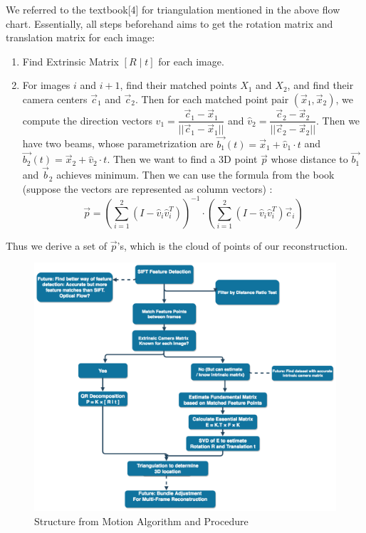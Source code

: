 \documentclass[10pt]{article}
\begin{document}
We referred to the textbook[4] for triangulation mentioned in the above flow chart. Essentially, all steps beforehand aims to get the rotation matrix and translation matrix for each image:
\begin{enumerate}
	\item Find Extrinsic Matrix $[R \mid t]$ for each image.
	\item For images $i$ and $i+1$, find their matched points $X_1$ and $X_2$, and find their camera centers $\vec{c}_1$ and $\vec{c}_2$. Then for each matched point pair $(\vec{x}_1, \vec{x}_2)$, we compute the direction vectors $\hat{v}_1 = \dfrac{\vec{c}_1 - \vec{x}_1}{||\vec{c}_1 - \vec{x}_1||}$ and $\hat{v}_2 = \dfrac{\vec{c}_2 - \vec{x}_2}{||\vec{c}_2 - \vec{x}_2||}$. Then we have two beams, whose parametrization are $\vec{b_1}(t) = \vec{x}_1 + \hat{v}_1 \cdot t$  and $\vec{b_2} (t) = \vec{x}_2 + \hat{v}_2 \cdot t$. Then we want to find a 3D point $\vec{p}$ whose distance to $\vec{b_1}$ and $\vec{b}_2$ achieves minimum. Then we can use the formula from the book (suppose the vectors are represented as column vectors) : $$\displaystyle \vec{p} = \left(\sum_{i=1}^2 (I - \hat{v}_i \hat{v}_i^T ) \right)^{-1} \cdot \left(\sum_{i=1}^2 (I - \hat{v}_i \hat{v}_i^T ) \vec{c}_i \right)$$
\end{enumerate}

Thus we derive a set of $\vec{p}$'s, which is the cloud of points of our reconstruction. 

\begin{figure}[H]
    \includegraphics[width=1.2\linewidth]{Diagram.png}
  \caption{Structure from Motion Algorithm and Procedure}
  \label{fig:procedure}
\end{figure}
\end{document}
